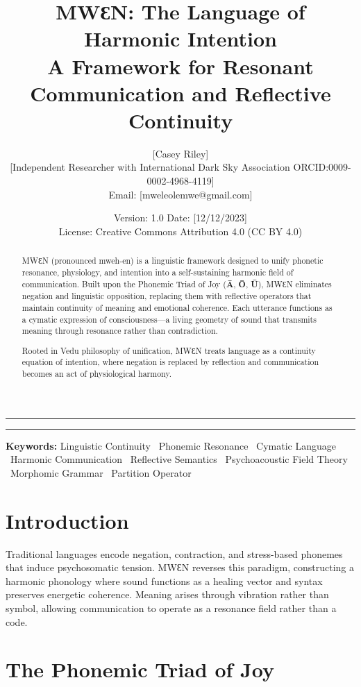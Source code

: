 \documentclass[11pt,a4paper]{article}
\title{\vspace{-2em}\Huge\bfseries MWƐN: The Language of Harmonic Intention\\
\large A Framework for Resonant Communication and Reflective Continuity}
\author{
    [Casey Riley] \\
    \small [Independent Researcher with International Dark Sky Association ORCID:0009-0002-4968-4119] \\
    \small Email: [mweleolemwe@gmail.com]
}
\date{\vspace{-1em}
    Version: 1.0 \quad \textbullet \quad Date: [12/12/2023] \\
    License: Creative Commons Attribution 4.0 (CC BY 4.0)
}
\begin{document}
\maketitle
\thispagestyle{plain} %

\hrule
\begin{abstract}
\noindent MWƐN (pronounced mweh-en) is a linguistic framework designed to unify phonetic resonance, physiology, and intention into a self-sustaining harmonic field of communication.
Built upon the Phonemic Triad of Joy (\textbf{Ā}, \textbf{Ō}, \textbf{Ū}), MWƐN eliminates negation and linguistic opposition, replacing them with reflective operators that maintain continuity of meaning and emotional coherence.
Each utterance functions as a cymatic expression of consciousness—a living geometry of sound that transmits meaning through resonance rather than contradiction.

Rooted in Vedu philosophy of unification, MWƐN treats language as a continuity equation of intention, where negation is replaced by reflection and communication becomes an act of physiological harmony.
\end{abstract}
\hrule
\vspace{1em}

\noindent\textbf{Keywords:} Linguistic Continuity \textperiodcentered \ Phonemic Resonance \textperiodcentered \ Cymatic Language \textperiodcentered \ Harmonic Communication \textperiodcentered \ Reflective Semantics \textperiodcentered \ Psychoacoustic Field Theory \textperiodcentered \ Morphomic Grammar \textperiodcentered \ Partition Operator
\vspace{1em}

\newpage

\section{Introduction}

Traditional languages encode negation, contraction, and stress-based phonemes that induce psychosomatic tension.
MWƐN reverses this paradigm, constructing a harmonic phonology where sound functions as a healing vector and syntax preserves energetic coherence.
Meaning arises through vibration rather than symbol, allowing communication to operate as a resonance field rather than a code.

\section{The Phonemic Triad of Joy}
\end{document}

